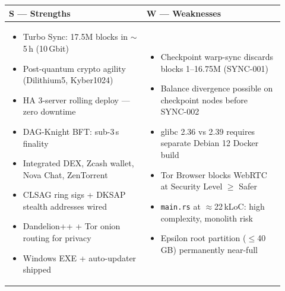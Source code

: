 \documentclass[12pt,a4paper]{article}
\begin{document}
\begin{table}[H]
\centering
\small
\renewcommand{\arraystretch}{1.35}
\begin{tabular}{|p{0.46\linewidth}|p{0.46\linewidth}|}
\hline
\cellcolor{swotS}\textcolor{qgreen}{\bfseries \large S — Strengths} &
\cellcolor{swotW}\textcolor{qred}{\bfseries \large W — Weaknesses} \\
\hline
\begin{minipage}[t]{0.43\linewidth}\vspace{3pt}
\begin{itemize}[leftmargin=*,topsep=0pt,itemsep=1pt,parsep=0pt]
  \item Turbo Sync: 17.5M blocks in $\sim$5\,h (10\,Gbit)
  \item Post-quantum crypto agility (Dilithium5, Kyber1024)
  \item HA 3-server rolling deploy — zero downtime
  \item DAG-Knight BFT: sub-3\,s finality
  \item Integrated DEX, Zcash wallet, Nova Chat, ZenTorrent
  \item CLSAG ring sigs + DKSAP stealth addresses wired
  \item Dandelion++ + Tor onion routing for privacy
  \item Windows EXE + auto-updater shipped
\end{itemize}\vspace{3pt}
\end{minipage} &
\begin{minipage}[t]{0.43\linewidth}\vspace{3pt}
\begin{itemize}[leftmargin=*,topsep=0pt,itemsep=1pt,parsep=0pt]
  \item Checkpoint warp-sync discards blocks 1--16.75M (SYNC-001)
  \item Balance divergence possible on checkpoint nodes before SYNC-002
  \item glibc 2.36 vs 2.39 requires separate Debian 12 Docker build
  \item Tor Browser blocks WebRTC at Security Level $\geq$ Safer
  \item \texttt{main.rs} at $\approx$22\,kLoC: high complexity, monolith risk
  \item Epsilon root partition ($\leq$40\,GB) permanently near-full
\end{itemize}\vspace{3pt}
\end{minipage} \\

\end{tabular}
\end{table}
\end{document}
